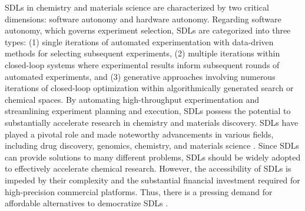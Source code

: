SDLs in chemistry and materials science are characterized by two critical dimensions: software autonomy and hardware autonomy. Regarding software autonomy, which governs experiment selection, SDLs are categorized into three types: (1) single iterations of automated experimentation with data-driven methods for selecting subsequent experiments, (2) multiple iterations within closed-loop systems where experimental results inform subsequent rounds of automated experiments, and (3) generative approaches involving numerous iterations of closed-loop optimization within algorithmically generated search or chemical spaces. By automating high-throughput experimentation and streamlining experiment planning and execution, SDLs possess the potential to substantially accelerate research in chemistry and materials discovery. SDLs have played a pivotal role and made noteworthy advancements in various fields, including drug discovery, genomics, chemistry, and materials science \cite{Tom2024}. Since SDLs can provide solutions to many different problems, SDLs should be widely adopted to effectively accelerate chemical research. However, the accessibility of SDLs is impeded by their complexity and the substantial financial investment required for high-precision commercial platforms. Thus, there is a pressing demand for affordable alternatives to democratize SDLs \cite{Lo2024}.